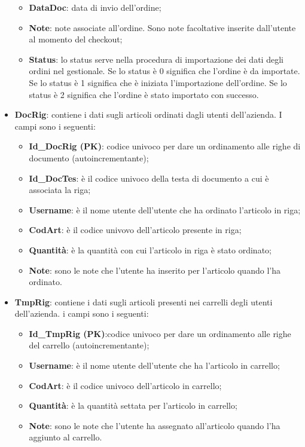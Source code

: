\begin{itemize}
\begin{itemize}
			\item \textbf{DataDoc}: data di invio dell'ordine;
			\item \textbf{Note}: note associate all'ordine. Sono note facoltative inserite dall'utente al momento del checkout;
			\item \textbf{Status}: lo status serve nella procedura di importazione dei dati degli ordini nel gestionale. Se lo status è 0 significa che l'ordine è da importate. Se lo status è 1 significa che è iniziata l'importazione dell'ordine. Se lo status è 2 significa che l'ordine è stato importato con successo.
		\end{itemize}
	\item \textbf{DocRig}: contiene i dati sugli articoli ordinati dagli utenti dell'azienda. I campi sono i seguenti:
		\begin{itemize}
			\item \textbf{Id_DocRig (PK)}: codice univoco per dare un ordinamento alle righe di documento (autoincrementante);
			\item \textbf{Id_DocTes}: è il codice univoco della testa di documento a cui è associata la riga;
			\item \textbf{Username}: è il nome utente dell'utente che ha ordinato l'articolo in riga;
			\item \textbf{CodArt}: è il codice univovo dell'articolo presente in riga;
			\item \textbf{Quantità}: è la quantità con cui l'articolo in riga è stato ordinato;
			\item \textbf{Note}: sono le note che l'utente ha inserito per l'articolo quando l'ha ordinato.
		\end{itemize}
	\item \textbf{TmpRig}: contiene i dati sugli articoli presenti nei carrelli degli utenti dell'azienda. i campi sono i seguenti:
		\begin{itemize}
			\item \textbf{Id_TmpRig (PK)}:codice univoco per dare un ordinamento alle righe del carrello (autoincrementante);
			\item \textbf{Username}: è il nome utente dell'utente che ha l'articolo in carrello;
			\item \textbf{CodArt}: è il codice univoco dell'articolo in carrello;
			\item \textbf{Quantità}: è la quantità settata per l'articolo in carrello;
			\item \textbf{Note}: sono le note che l'utente ha assegnato all'articolo quando l'ha aggiunto al carrello.

\end{itemize}
\end{itemize}
